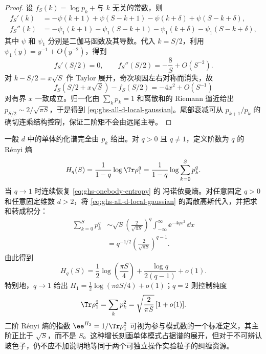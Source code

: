 \begin{proof}
设 $f_S(k)=\log p_k+\text{与 $k$ 无关的常数}$，则
\begin{align*}
f_S'(k)
&=-\psi(k+1)+\psi(S-k+1)
-\psi(k+\delta)+\psi(S-k+\delta),\\
f_S''(k)
&=-\psi_1(k+1)-\psi_1(S-k+1)
-\psi_1(k+\delta)-\psi_1(S-k+\delta),
\end{align*}
其中 $\psi$ 和 $\psi_1$ 分别是二伽马函数及其导数。代入 $k=S/2$，利用 $\psi_1(y)=y^{-1}+O(y^{-2})$，得到
\begin{equation*}
f_S'(S/2)=0,\qquad f_S''(S/2)=-\frac8S+O(S^{-2}).
\end{equation*}
对 $k-S/2=x\sqrt S$ 作 Taylor 展开，奇次项因左右对称而消失，故
\begin{equation*}
f_S(S/2+x\sqrt S)-f_S(S/2)
=-4x^2+O(S^{-1})
\end{equation*}
对有界 $x$ 一致成立。归一化由 $\sum_kp_k=1$ 和离散和的 Riemann 逼近给出 $p_{S/2}\sim 2/\sqrt{\pi S}$，于是得到 \cref{eq:ghs-all-d-local-gaussian}。尾部衰减可从 $p_{k+1}/p_k$ 的确切连乘结构控制，保证二阶矩不会由远尾主导。
\end{proof}

一般 $d$ 中的单体约化谱完全由 $p_k$ 给出。对 $q>0$ 且 $q\neq1$，定义阶数为 $q$ 的 Rényi 熵
\begin{equation}\label{eq:ghs-renyi-definition}
 H_q(S)=\frac1{1-q}\log\Tr\rho_1^q
 =\frac1{1-q}\log\sum_{k=0}^S p_k^q.
\end{equation}
当 $q\to1$ 时连续恢复 \cref{eq:ghs-onebody-entropy} 的 冯诺依曼熵。对任意固定 $q>0$ 和任意固定维数 $d>2$，将 \cref{eq:ghs-all-d-local-gaussian} 的离散高斯代入，并把求和转成积分：
\begin{align*}
 \sum_{k=0}^S p_k^q
 &\sim \sqrt S\left(\frac2{\sqrt{\pi S}}\right)^q
 \int_{-\infty}^{\infty}\ee^{-4qx^2}\,\dd x\\
 &=q^{-1/2}\left(\frac2{\sqrt{\pi S}}\right)^{q-1}.
\end{align*}
由此得到
\begin{equation}\label{eq:ghs-renyi-asymptotic}
 H_q(S)=\frac12\log\left(\frac{\pi S}{4}\right)
 +\frac{\log q}{2(q-1)}+o(1).
\end{equation}
特别地，$q\to1$ 给出 $H_1=\frac12\log(\pi\ee S/4)+o(1)$；$q=2$ 则控制纯度
\begin{equation}\label{eq:ghs-onebody-purity-asymptotic}
 \Tr\rho_1^2=\sum_kp_k^2
 =\sqrt{\frac2{\pi S}}\,[1+o(1)].
\end{equation}
二阶 Rényi 熵的指数 $\ee^{H_2}=1/\Tr\rho_1^2$ 可视为参与模式数的一个标准定义，其主阶正比于 $\sqrt S$，而不是 $S$。这种增长刻画单体模式占据谱的展开，但对于不可辨认玻色子，仍不应不加说明地等同于两个可独立操作实验粒子的纠缠资源。


